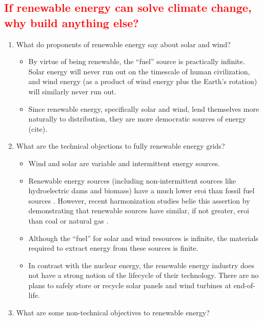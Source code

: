 \subsection{\textcolor{red}{If renewable energy can solve climate change, why
build anything else?}}

\begin{enumerate}
    \item What do proponents of renewable energy say about solar and wind?
    \begin{itemize}
        \item By virtue of being renewable, the ``fuel'' source is practically
        infinite. Solar energy will never run out on the timescale of human
        civilization, and wind energy (as a product of wind energy plus the
        Earth's rotation) will similarly never run out.
        \item Since renewable energy, specifically solar and wind, lend
        themselves more naturally to distribution, they are more democratic
        sources of energy (cite).
    \end{itemize}
    \item What are the technical objections to fully renewable energy grids?
    \begin{itemize}
        \item Wind and solar are variable and intermittent energy sources.
        \item Renewable energy sources (including non-intermittent sources like
        hydroelectric dams and biomass) have a much lower \ac{eroi} than fossil
        fuel sources \cite{hall_eroi_2014,weisbach_energy_2013}. However, recent
        harmonization studies belie this assertion by demonstrating that
        renewable sources have similar, if not greater, \ac{eroi} than coal or
        natural gas \cite{murphy_energy_2022}.
        \item Although the ``fuel'' for solar and wind resources is infinite,
        the materials required to extract energy from these sources is finite.
        \item In contrast with the nuclear energy, the renewable energy industry
        does not have a strong notion of the lifecycle of their technology.
        There are no plans to safely store or recycle solar panels and wind
        turbines at end-of-life.
    \end{itemize}
    \item What are some non-technical objectives to renewable energy?
    \begin{itemize}

\end{itemize}
\end{enumerate}
